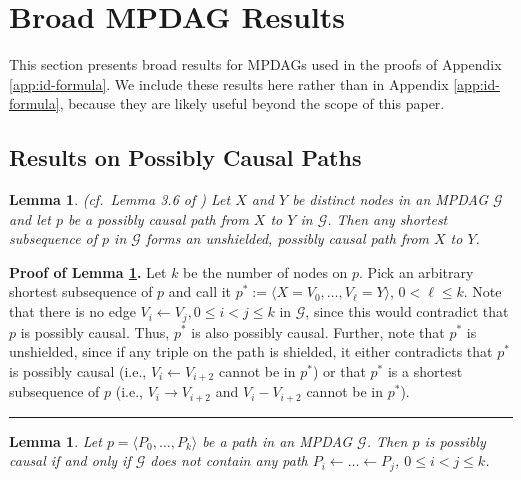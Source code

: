\documentclass[11pt]{article}
\newcommand{\BlackBox}{\rule{1.5ex}{1.5ex}}  %
\newtheorem{lemma}[theorem]{Lemma}
\newcommand{\g}[1][G]{\mathcal{#1}}
\newenvironment{proofof}[1][]{\noindent \textbf{Proof of #1.}}{\hfill\BlackBox}
\begin{document}

\section{Broad MPDAG Results}
\label{app:mpdags}

This section presents broad results for MPDAGs used in the proofs of Appendix \ref{app:id-formula}. We include these results here rather than in Appendix \ref{app:id-formula}, because they are likely useful beyond the scope of this paper. 






\subsection{Results on Possibly Causal Paths}

\begin{lemma}
\label{lem:shortest-subseq}
{\normalfont (cf.\ Lemma 3.6 of \citealp{perkovic2017interpreting})}
    Let $X$ and $Y$ be distinct nodes in an MPDAG $\g$ and let $p$ be a possibly causal path from $X$ to $Y$ in $\g$. Then any shortest subsequence of $p$ in $\g$ forms an unshielded, possibly causal path from $X$ to $Y$. 
\end{lemma}


\begin{proofof}[Lemma \ref{lem:shortest-subseq}]    
    Let $k$ be the number of nodes on $p$. Pick an arbitrary shortest subsequence of $p$ and call it $p^* :=\langle X=V_0, \dots, V_\ell=Y \rangle$, $0 < \ell \le k$. Note that there is no edge $V_i \gets V_j, 0 \le i < j \le k$ in $\g$, since this would contradict that $p$ is possibly causal. Thus, $p^*$ is also possibly causal. Further, note that $p^*$ is unshielded, since if any triple on the path is shielded, it either contradicts that $p^*$ is possibly causal (i.e., $V_i \gets V_{i+2}$ cannot be in $p^*$) or that $p^*$ is a shortest subsequence of $p$ (i.e., $V_i \to V_{i+2}$ and $V_i - V_{i+2}$ cannot be in $p^*$).
\end{proofof}


\begin{lemma} 
\label{lem:nobackpaths}
    Let $p=\langle P_0, \dots, P_k \rangle$ be a path in an MPDAG $\g$. Then $p$ is possibly causal if and only if $\g$ does not contain any path $P_i \gets \dots \gets P_j$, $0 \le i < j \le k$.
\end{lemma}
\end{document}
